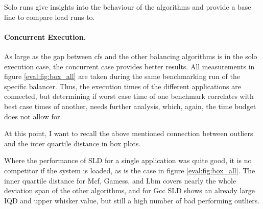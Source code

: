 Solo runs give insights into the behaviour of the algorithms and provide
a base line to compare load runs to.


\paragraph{Concurrent Execution.}
As large as the gap between \gls{cfs} and the other balancing algorithms is in
the solo execution case, the concurrent case provides better results.
All measurements in figure \ref{eval:fig:box_all} are taken during the same
benchmarking run of the specific balancer.
Thus, the execution times of the different applications are connected, but
determining if worst case time of one benchmark correlates with best case times
of another, needs further analysis, which, again, the time budget does not
allow for.

At this point, I want to recall the above mentioned connection between outliers
and the inter quartile distance in box plots.

Where the performance of SLD for a single application was quite good, it is
no competitor if the system is loaded, as is the case in figure
\ref{eval:fig:box_all}.
The inner quartile distance for Mcf, Gamess, and Lbm covers nearly the whole
deviation span of the other algorithms, and for Gcc SLD shows an already large
IQD and upper whisker value, but still a high number of bad performing outliers.

